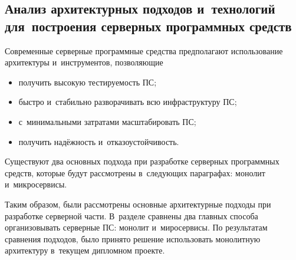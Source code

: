 \subsection{Анализ архитектурных подходов и~технологий для~построения серверных программных средств}
\label{sec:analysis:research:backArch}

Современные серверные программные средства предполагают использование архитектуры и~инструментов, позволяющие

\begin{itemize}
\item получить высокую тестируемость ПС;
\item быстро и~стабильно разворачивать всю инфраструктуру ПС;
\item с~минимальными затратами масштабировать ПС;
\item получить надёжность и~отказоустойчивость.
\end{itemize}

Существуют два основных подхода при разработке серверных программных средств, которые будут рассмотрены в~следующих параграфах: монолит и~микросервисы.




Таким образом, были рассмотрены основные архитектурные подходы при разработке серверной части. В~разделе сравнены два главных способа организовывать серверные ПС: монолит и~миросервисы. По результатам сравнения подходов, было принято решение использовать монолитную архитектуру в~текущем дипломном проекте.